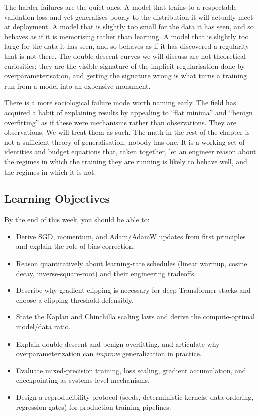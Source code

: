 The harder failures are the quiet ones. A model that trains to a
respectable validation loss and yet generalises poorly to the
distribution it will actually meet at deployment. A model that is
slightly too small for the data it has seen, and so behaves as if
it is memorising rather than learning. A model that is slightly
too large for the data it has seen, and so behaves as if it has
discovered a regularity that is not there. The double-descent
curves we will discuss are not theoretical curiosities; they are
the visible signature of the implicit regularisation done by
overparameterisation, and getting the signature wrong is what
turns a training run from a model into an expensive monument.

There is a more sociological failure mode worth naming early. The
field has acquired a habit of explaining results by appealing to
``flat minima'' and ``benign overfitting'' as if these were
mechanisms rather than observations. They are observations. We
will treat them as such. The math in the rest of the chapter is
not a sufficient theory of generalisation; nobody has one. It is
a working set of identities and budget equations that, taken
together, let an engineer reason about the regimes in which the
training they are running is likely to behave well, and the
regimes in which it is not.

\subsection{Learning Objectives}

By the end of this week, you should be able to:
\begin{itemize}
  \item Derive SGD, momentum, and Adam/AdamW updates from first principles and
        explain the role of bias correction.
  \item Reason quantitatively about learning-rate schedules (linear warmup,
        cosine decay, inverse-square-root) and their engineering tradeoffs.
  \item Describe why gradient clipping is necessary for deep Transformer
        stacks and choose a clipping threshold defensibly.
  \item State the Kaplan and Chinchilla scaling laws and derive the
        compute-optimal model/data ratio.
  \item Explain double descent and benign overfitting, and articulate why
        overparameterization can \emph{improve} generalization in practice.
  \item Evaluate mixed-precision training, loss scaling, gradient
        accumulation, and checkpointing as systems-level mechanisms.
  \item Design a reproducibility protocol (seeds, deterministic kernels,
        data ordering, regression gates) for production training pipelines.
\end{itemize}

